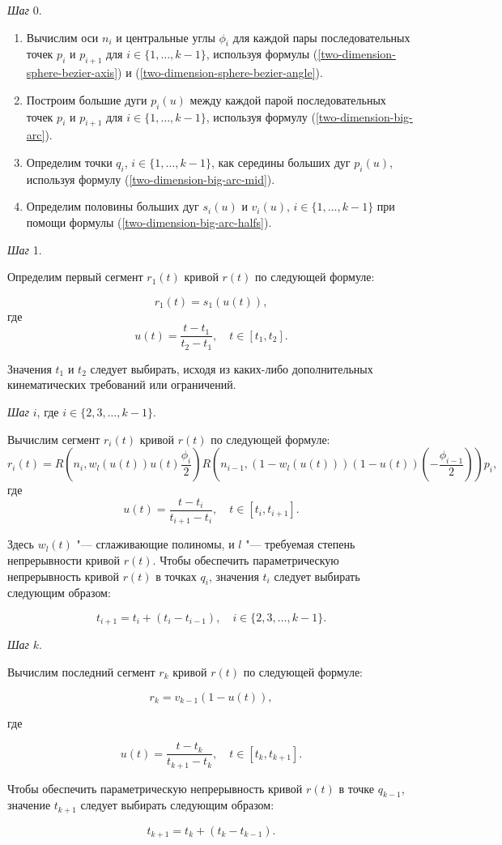 \bigskip
\textit{Шаг} 0.

\begin{enumerate}
\item Вычислим оси $n_i$ и центральные углы $\phi_i$ для каждой пары последовательных точек $p_i$ и $p_{i+1}$ для
$i \in \{1,\dots,k-1\}$, используя формулы (\ref{two-dimension-sphere-bezier-axis}) и
(\ref{two-dimension-sphere-bezier-angle}).
\item Построим большие дуги $p_i(u)$ между каждой парой последовательных точек $p_i$ и $p_{i+1}$ для
$i \in \{1,\dots,k-1\}$, используя формулу (\ref{two-dimension-big-arc}).
\item Определим точки $q_i$, $i \in \{1,\dots,k-1\}$, как середины больших дуг $p_i(u)$, используя формулу
(\ref{two-dimension-big-arc-mid}).
\item Определим половины больших дуг $s_i(u)$ и $v_i(u)$, $i \in \{1,\dots,k-1\}$ при помощи формулы
(\ref{two-dimension-big-arc-halfs}).
\end{enumerate}

\bigskip
\textit{Шаг} 1.

Определим первый сегмент $r_1(t)$ кривой $r(t)$ по следующей формуле:

$$
r_1(t)=s_1(u(t)),
$$
\noindent где
$$
u(t)=\frac{t-t_1}{t_2-t_1}, \quad t \in [t_1,t_2].
$$

Значения $t_1$ и $t_2$ следует выбирать, исходя из каких-либо дополнительных кинематических требований или ограничений.

\bigskip
\textit{Шаг} $i$, где $i \in \{2,3,\dots,k-1\}$.

Вычислим сегмент $r_i(t)$ кривой $r(t)$ по следующей формуле:
$$
r_i(t)=R(n_i,w_l(u(t))u(t)\frac{\phi_i}{2})R(n_{i-1},(1-w_l(u(t)))(1-u(t))(-\frac{\phi_{i-1}}{2}))p_i,
$$
\noindent где
$$
u(t)=\frac{t-t_i}{t_{i+1}-t_i}, \quad t \in [t_i,t_{i+1}].
$$

Здесь $w_l(t)$ "--- сглаживающие полиномы, и $l$ "--- требуемая степень непрерывности кривой $r(t)$. Чтобы обеспечить
параметрическую непрерывность кривой $r(t)$ в точках $q_i$, значения $t_i$ следует выбирать следующим образом:

$$
t_{i+1}=t_i+(t_i-t_{i-1}), \quad i \in \{2,3,\dots,k-1\}.
$$

\bigskip
\textit{Шаг} $k$.

Вычислим последний сегмент $r_k$ кривой $r(t)$ по следующей формуле:

$$
r_k=v_{k-1}(1-u(t)),
$$

\noindent где

$$
u(t)=\frac{t-t_k}{t_{k+1}-t_k}, \quad t \in [t_k,t_{k+1}].
$$

Чтобы обеспечить параметрическую непрерывность кривой $r(t)$ в точке $q_{k-1}$, значение $t_{k+1}$ следует выбирать
следующим образом:

$$
t_{k+1}=t_k+(t_k-t_{k-1}).
$$
